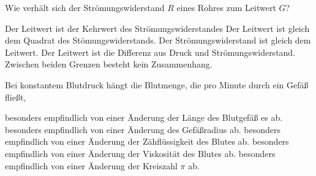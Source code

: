 \documentclass[11pt]{exam}
\begin{document}
\begin{questions}
\vspace{3mm}\question Wie verhält sich der Strömungswiderstand \(R\) eines Rohres zum Leitwert \(G\)?

\begin{choices}
	\choice Der Leitwert ist der Kehrwert des Strömungswiderstandes
	\choice Der Leitwert ist gleich dem Quadrat des Stömungswiderstands.
	\choice Der Strömungswiderstand ist gleich dem Leitwert.
	\choice Der Leitwert ist die Differenz aus Druck und Strömungswiderstand.
	\choice Zwischen beiden Grenzen besteht kein Zusammenhang.
\end{choices}

\vspace{3mm}\question Bei konstantem Blutdruck hängt die Blutmenge, die pro Minute durch ein Gefäß fließt,

\begin{choices}
	\choice besonders empfindlich von einer Änderung der Länge des Blutgefäß es ab.
	\choice besonders empfindlich von einer Änderung des Gefäßradius ab.
	\choice besonders empfindlich von einer Änderung der Zähflüssigkeit des Blutes ab.
	\choice besonders empfindlich von einer Änderung der Viskosität des Blutes ab.
	\choice besonders empfindlich von einer Änderung der Kreiszahl \(\pi\) ab.
\end{choices}

\vspace{3mm}\end{questions}
\end{document}
